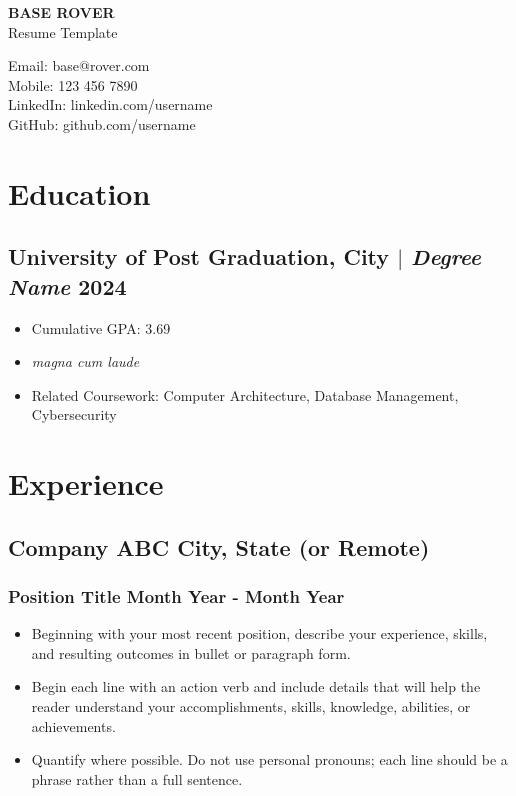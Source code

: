 \documentclass[11pt]{article} %
\begin{document}
\begin{center}
	\begin{minipage}{0.5\textwidth}
		{\Huge\bfseries
			BASE ROVER %
		} \\ \medskip
		Resume Template %
	\end{minipage} \hfill
	\begin{minipage}{0.4\textwidth}
		\raggedleft
		Email: base@rover.com \\
		Mobile: 123 456 7890 \\
		LinkedIn: linkedin.com/username \\
		GitHub: github.com/username
	\end{minipage}
\end{center}

\section{Education}
\subsection{University of Post Graduation, City $|$ {\normalfont\itshape Degree Name} \hfill 2024}
\begin{itemize}
	\item Cumulative GPA: 3.69
	\item \textit{magna cum laude} 
  \item Related Coursework: Computer Architecture, Database Management, Cybersecurity
\end{itemize}

\section{Experience}
\subsection{Company ABC \hfill City, State (or Remote)}
\subsubsection{Position Title \hfill  Month Year - Month Year}
\begin{itemize}
	\item Beginning with your most recent position, describe your experience, skills, and resulting outcomes in bullet or paragraph form.
	\item Begin each line with an action verb and include details that will help the reader understand your accomplishments, skills, knowledge, abilities, or achievements.
	\item Quantify where possible. Do not use personal pronouns; each line should be a phrase rather than a full sentence.
\end{itemize}
\end{document}
